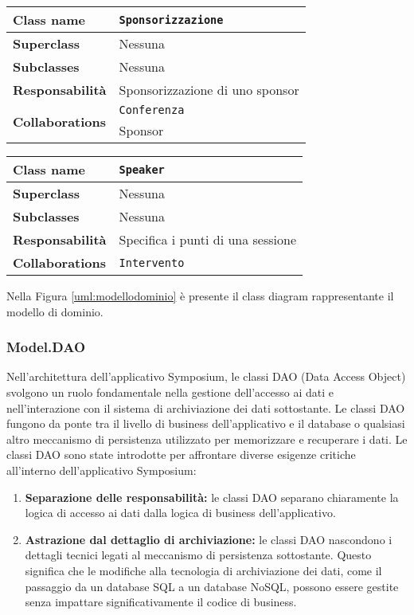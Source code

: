 \begin{table}[h!]
\begin{tabular}{|l|l|}
	\hline
	\textbf{Class name} & \texttt{Sponsorizzazione} \\ \hline
	\textbf{Superclass} & Nessuna \\ \hline
	\textbf{Subclasses} & Nessuna  \\ \hline
	\textbf{Responsabilità} & Sponsorizzazione di uno sponsor \\ \hline
	\multirow{2}{*}{\textbf{Collaborations}} & \texttt{Conferenza} \\ 
	& Sponsor \\ \hline
\end{tabular}
\end{table}

\begin{table}[h!]
\begin{tabular}{|l|l|}
	\hline
	\textbf{Class name} & \texttt{Speaker} \\ \hline
	\textbf{Superclass} & Nessuna \\ \hline
	\textbf{Subclasses} & Nessuna  \\ \hline
	\textbf{Responsabilità} & Specifica i punti di una sessione \\ \hline
	\multirow{1}{*}{\textbf{Collaborations}} & \texttt{Intervento} \\ \hline
\end{tabular}
\end{table}

Nella Figura \ref{uml:modellodominio} è presente il class diagram rappresentante il modello di dominio. 

\clearpage
\pagebreak

\subsubsection{Model.DAO}
Nell'architettura dell'applicativo Symposium, le classi DAO (Data Access Object) svolgono un ruolo fondamentale nella gestione dell'accesso ai dati e nell'interazione con il sistema di archiviazione dei dati sottostante. Le classi DAO fungono da ponte tra il livello di business dell'applicativo e il database o qualsiasi altro meccanismo di persistenza utilizzato per memorizzare e recuperare i dati. Le classi DAO sono state introdotte per affrontare diverse esigenze critiche all'interno dell'applicativo Symposium:
\begin{enumerate}
	\item \textbf{Separazione delle responsabilità:} le classi DAO separano chiaramente la logica di accesso ai dati dalla logica di business dell'applicativo. 
	\item \textbf{Astrazione dal dettaglio di archiviazione:} le classi DAO nascondono i dettagli tecnici legati al meccanismo di persistenza sottostante. Questo significa che le modifiche alla tecnologia di archiviazione dei dati, come il passaggio da un database SQL a un database NoSQL, possono essere gestite senza impattare significativamente il codice di business.
\end{enumerate}

